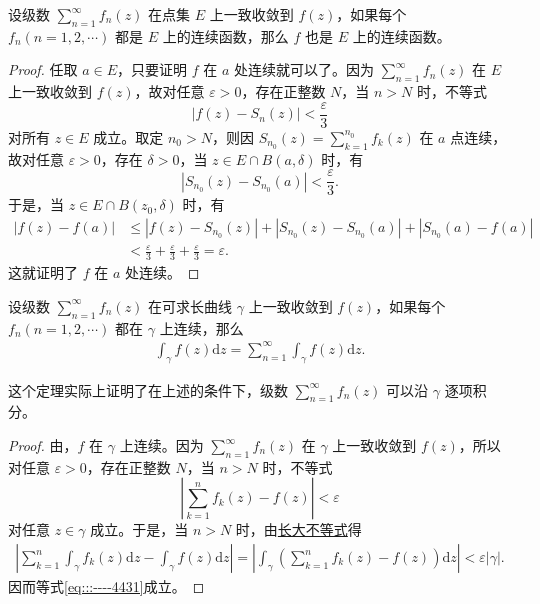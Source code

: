 \documentclass[../../main.tex]{subfiles}%
\begin{document}
\begin{theorem}\label{theorem:定理4.1.4}
设级数 \( \sum_{n=1}^{\infty} f_n(z) \) 在点集 \( E \) 上一致收敛到 \( f(z) \)，如果每个 \( f_n (n = 1, 2, \cdots) \) 都是 \( E \) 上的连续函数，那么 \( f \) 也是 \( E \) 上的连续函数。
\end{theorem}
\begin{proof}
任取 \( a \in E \)，只要证明 \( f \) 在 \( a \) 处连续就可以了。因为 \( \sum_{n=1}^{\infty} f_n(z) \) 在 \( E \) 上一致收敛到 \( f(z) \)，故对任意 \( \varepsilon > 0 \)，存在正整数 \( N \)，当 \( n > N \) 时，不等式
\[
|f(z) - S_n(z)| < \frac{\varepsilon}{3}
\]
对所有 \( z \in E \) 成立。取定 \( n_0 > N \)，则因 \( S_{n_0}(z) = \sum_{k=1}^{n_0} f_k(z) \) 在 \( a \) 点连续，故对任意 \( \varepsilon > 0 \)，存在 \( \delta > 0 \)，当 \( z \in E \cap B(a, \delta) \) 时，有
\[
|S_{n_0}(z) - S_{n_0}(a)| < \frac{\varepsilon}{3}.
\]
于是，当 \( z \in E \cap B(z_0, \delta) \) 时，有
\begin{align*}
|f(z) - f(a)| &\leqslant |f(z) - S_{n_0}(z)| + |S_{n_0}(z) - S_{n_0}(a)| + |S_{n_0}(a) - f(a)| \\
&< \frac{\varepsilon}{3} + \frac{\varepsilon}{3} + \frac{\varepsilon}{3}= \varepsilon.
\end{align*}
这就证明了 \( f \) 在 \( a \) 处连续。
\end{proof}

\begin{theorem}\label{theorem:定理4.1.5}
设级数 \( \sum_{n=1}^{\infty} f_n(z) \) 在可求长曲线 \( \gamma \) 上一致收敛到 \( f(z) \)，如果每个 \( f_n (n = 1, 2, \cdots) \) 都在 \( \gamma \) 上连续，那么
\begin{align}
\int_{\gamma} f(z) \mathrm{d}z = \sum_{n=1}^{\infty} \int_{\gamma} f(z) \mathrm{d}z.\label{eq:::----4431}
\end{align}
\end{theorem}
\begin{remark}
这个定理实际上证明了在上述的条件下，级数 \( \sum_{n=1}^{\infty} f_n(z) \) 可以沿 \( \gamma \) 逐项积分。
\end{remark}
\begin{proof}
由，\( f \) 在 \( \gamma \) 上连续。因为 \( \sum_{n=1}^{\infty} f_n(z) \) 在 \( \gamma \) 上一致收敛到 \( f(z) \)，所以对任意 \( \varepsilon > 0 \)，存在正整数 \( N \)，当 \( n > N \) 时，不等式
\[
\left| \sum_{k=1}^{n} f_k(z) - f(z) \right| < \varepsilon
\]
对任意 \( z \in \gamma \) 成立。于是，当 \( n > N \) 时，由\hyperref[theorem:长大不等式]{长大不等式}得
\begin{align*}
\left| \sum_{k=1}^{n} \int_{\gamma} f_k(z) \mathrm{d}z - \int_{\gamma} f(z) \mathrm{d}z \right| = \left| \int_{\gamma} \left( \sum_{k=1}^{n} f_k(z) - f(z) \right) \mathrm{d}z \right| < \varepsilon |\gamma|.
\end{align*}
因而等式\eqref{eq:::----4431}成立。
\end{proof}
\end{document}

